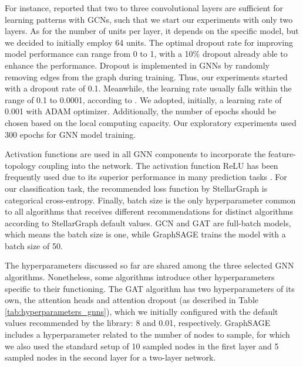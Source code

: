 For instance, \citet{kipf2016semi} reported that two to three convolutional layers are sufficient for learning patterns with GCNs, such that we start our experiments with only two layers. As for the number of units per layer, it depends on the specific model, but we decided to initially employ 64 units. The optimal dropout rate for improving model performance can range from 0 to 1, with a 10\% dropout already able to enhance the performance. Dropout is implemented in GNNs by randomly removing edges from the graph during training. Thus, our experiments started with a dropout rate of 0.1. Meanwhile, the learning rate usually falls within the range of 0.1 to 0.0001, according to \citet{koutsoukas2017deep}. We adopted, initially, a learning rate of 0.001 with ADAM optimizer. Additionally, the number of epochs should be chosen based on the local computing capacity. Our exploratory experiments used 300 epochs for GNN model training.

Activation functions are used in all GNN components to incorporate the feature-topology coupling into the network. The activation function ReLU has been frequently used due to its superior performance in many prediction tasks \cite{goodfellow2016deep}. For our classification task, the recommended loss function by StellarGraph is categorical cross-entropy. Finally, batch size is the only hyperparameter common to all algorithms that receives different recommendations for distinct algorithms according to StellarGraph default values. GCN and GAT are full-batch models, which means the batch size is one, while GraphSAGE trains the model with a batch size of 50.

The hyperparameters discussed so far are shared among the three selected GNN algorithms. Nonetheless, some algorithms introduce other hyperparameters specific to their functioning. The GAT algorithm has two hyperparameters of its own, the attention heads and attention dropout (as described in Table \ref{tab:hyperparameters_gnns}), which we initially configured with the default values recommended by the library: 8 and 0.01, respectively. GraphSAGE includes a hyperparameter related to the number of nodes to sample, for which we also used the standard setup of 10 sampled nodes in the first layer and 5 sampled nodes in the second layer for a two-layer network.


